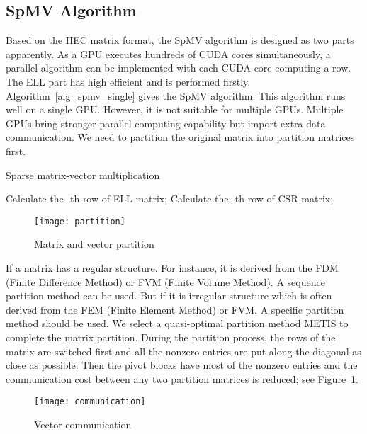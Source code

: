 \documentclass[runningheads,a4paper]{llncs}
\begin{document}
{\subsection{SpMV Algorithm}
Based on the HEC matrix format, the SpMV algorithm is designed as two parts apparently. As a GPU executes hundreds of CUDA cores simultaneously, a parallel algorithm can be implemented with each CUDA core computing a row. The ELL part has high efficient and is performed firstly. Algorithm~\ref{alg_spmv_single} gives the SpMV algorithm. This algorithm runs well on a single GPU. However, it is not suitable for multiple GPUs. Multiple GPUs bring stronger parallel computing capability but import extra data communication. We need to partition the original matrix into partition matrices first.

\begin{algorithm}[htb]
\caption{Sparse matrix-vector multiplication}
\label{alg_spmv_single}
\begin{algorithmic}[1]
 
  \State Calculate the -th row of ELL matrix; 
\EndFor
\State
{} 
  \State Calculate the -th row of CSR matrix; 
\EndFor
\end{algorithmic}
\end{algorithm}

\begin{figure}[!tbh]
    \centering
    \texttt{[image: partition]}
    \caption{Matrix and vector partition}
    \label{fig_partition}
\end{figure}

If a matrix has a regular structure. For instance, it is derived from the FDM (Finite Difference Method) or FVM (Finite Volume Method). A sequence partition method can be used. But if it is irregular structure which is often derived from the FEM (Finite Element Method) or FVM. A specific partition method should be used. We select a quasi-optimal partition method METIS to complete the matrix partition. During the partition process, the rows of the matrix are switched first and all the nonzero entries are put along the diagonal as close as possible. Then the pivot blocks have most of the nonzero entries and the communication cost between any two partition matrices is reduced; see Figure~\ref{fig_partition}.

\begin{figure}[!tbh]
    \centering
    \texttt{[image: communication]}
    \caption{Vector communication}
    \label{fig_communication}
\end{figure}

}
\end{document}
